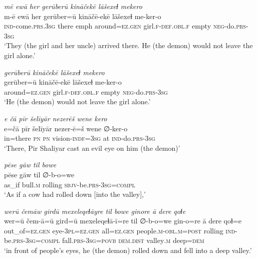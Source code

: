 \ea \label{ZP.75}
\textit{mē ewā her gerūberū kināčekē lāšexeɫ mekero} \\ 
\gll m-ē ewā her gerūber=ū kināčē-ekē lāšexeɫ me-ker-o \\ 
 \textsc{ind-}come\textsc{.prs}\textsc{.3sg} there emph around\textsc{\textsc{=ez.gen}} girl\textsc{.f}\textsc{-def}\textsc{.obl}\textsc{.f} empty \textsc{neg-}do\textsc{.prs}\textsc{-3sg} \\ 
\glt `They (the girl and her uncle) arrived there. He (the demon) would not leave the girl alone.'
\z 
 
\ea \label{ZP.76}
\textit{gerūberū kināčekē lāšexeɫ mekero} \\ 
\gll gerūber=ū kināčē-ekē lāšexeɫ me-ker-o \\ 
 around\textsc{\textsc{=ez.gen}} girl\textsc{.f}\textsc{-def}\textsc{.obl}\textsc{.f} empty \textsc{neg-}do\textsc{.prs}\textsc{-3sg} \\ 
\glt `He (the demon) would not leave the girl alone.'
\z 
 
\ea \label{ZP.78}
\textit{e čā pīr šelīyār nezerēš wene kero} \\ 
\gll e=čā pīr šelīyār nezer-ē=š wene ∅-ker-o \\ 
 in=there \textsc{pn} \textsc{pn} vision\textsc{-indf}\textsc{=3sg} at \textsc{ind-}do\textsc{.prs}\textsc{-3sg} \\ 
\glt `There, Pir Shaliyar cast an evil eye on him (the demon)'
\z 
 
\ea \label{ZP.79}
\textit{pēse gāw til bowe} \\ 
\gll pēse gāw til ∅-b-o=we \\ 
 as\_if bull\textsc{.m} rolling \textsc{sbjv-}be\textsc{.prs}\textsc{-3sg}\textsc{=compl} \\ 
\glt `As if a cow had rolled down [into the valley],'
\z 
 
\ea \label{ZP.80}
\textit{werū čemāw girdū mexeleqeɫāyre til bowe ginore ā dere qoɫe} \\ 
\gll wer=ū čem-ā=ū gird=ū mexeleqeɫā-ī=re til ∅-b-o=we gin-o=re ā dere qoɫ=e \\ 
 out\_of\textsc{\textsc{=ez.gen}} eye\textsc{-3pl}\textsc{\textsc{=ez.gen}} all\textsc{\textsc{=ez.gen}} people\textsc{.m}\textsc{-obl}\textsc{.m}\textsc{=\textsc{post}} rolling \textsc{ind-}be\textsc{.prs}\textsc{-3sg}\textsc{=compl} fall\textsc{.prs}\textsc{-3sg}\textsc{=\textsc{povb}} \textsc{dem.dist} valley\textsc{.m} deep\textsc{=dem} \\ 
\glt `in front of people’s eyes, he (the demon) rolled down and fell into a deep valley.'
\z 
 
